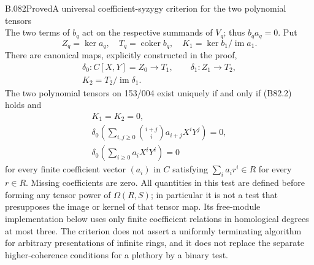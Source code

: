 \begin{saresult}{B.082}{Proved}{A universal coefficient-syzygy criterion for the two polynomial tensors}
\[                                                        \tag{B82.4}
\]
The two terms of $b_q$ act on the respective summands of $V_q$;
thus $b_qa_q=0$. Put
\[
 Z_q=\ker a_q,\quad T_q=\operatorname{coker}b_q,\quad
 K_1=\ker b_1/\operatorname{im}a_1.                       \tag{B82.5}
\]
There are canonical maps, explicitly constructed in the proof,
\[
\begin{gathered}
 \delta_0:C[X,Y]=Z_0\longrightarrow T_1,
 \qquad \delta_1:Z_1\longrightarrow T_2,\\
 K_2=T_2/\operatorname{im}\delta_1.
\end{gathered}                                           \tag{B82.6}
\]
The two polynomial tensors on 153/004 exist uniquely if and only if
(B82.2) holds and
\[
\begin{gathered}
                         K_1=K_2=0,\\
 \delta_0\left(\sum_{i,j\ge0}\binom{i+j}{i}
                        a_{i+j}X^iY^j\right)=0,\\
 \delta_0\left(\sum_{i\ge0}a_iX^iY^i\right)=0            \tag{B82.7}
\end{gathered}
\]
for every finite coefficient vector $(a_i)$ in $C$ satisfying
$\sum_i a_ir^i\in R$ for every $r\in R$. Missing coefficients are zero.
All quantities in this test are defined before forming any tensor
power of $\Omega(R,S)$; in particular it is not a test that presupposes
the image or kernel of that tensor map. Its free-module implementation
below uses only finite coefficient relations in homological degrees
at most three. The criterion does not assert a uniformly terminating
algorithm for arbitrary presentations of infinite rings, and it
does not replace the separate higher-coherence conditions for a
plethory by a binary test.
\end{saresult}
